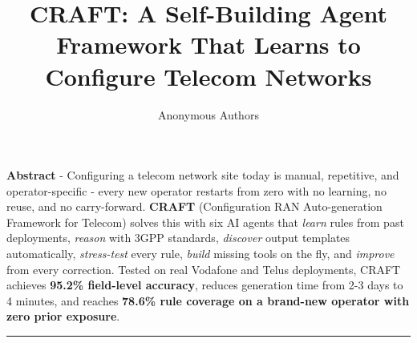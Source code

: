 \documentclass[10pt]{article}
\title{\textbf{\large CRAFT: A Self-Building Agent Framework That Learns to Configure Telecom Networks}}
\author{Anonymous Authors}
\date{}
\begin{document}
\maketitle
\noindent\textbf{Abstract} - Configuring a telecom network site today is manual, repetitive, and operator-specific - every new operator restarts from zero with no learning, no reuse, and no carry-forward. \textbf{CRAFT} (Configuration RAN Auto-generation Framework for Telecom) solves this with six AI agents that \emph{learn} rules from past deployments, \emph{reason} with 3GPP standards, \emph{discover} output templates automatically, \emph{stress-test} every rule, \emph{build} missing tools on the fly, and \emph{improve} from every correction. Tested on real Vodafone and Telus deployments, CRAFT achieves \textbf{95.2\% field-level accuracy}, reduces generation time from 2-3 days to 4 minutes, and reaches \textbf{78.6\% rule coverage on a brand-new operator with zero prior exposure}.
\vspace{4pt}\hrule\vspace{4pt}
\end{document}
